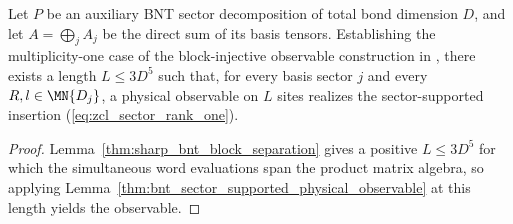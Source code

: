 \begin{lemma}%
    \label{thm:bnt_rank_one_observables_sharp_length}
    \leanok
    Let $P$ be an auxiliary BNT sector decomposition of total bond dimension
    $D$, and let $A=\bigoplus_j A_j$ be the direct sum of its basis tensors.
    Establishing the multiplicity-one case of the block-injective observable
    construction in
    \cite[proof of Theorem~3.8, lines~1252--1256]{Cirac2016MPDO_arXiv}, there
    exists a length $L\leq3D^5$ such that, for every basis sector $j$ and every
    $R,l\in\MN{D_j}$, a physical observable on $L$ sites realizes the
    sector-supported insertion (\ref{eq:zcl_sector_rank_one}).
\end{lemma}
\begin{proof}\leanok
    Lemma~\ref{thm:sharp_bnt_block_separation} gives a positive
    $L\leq3D^5$ for which the simultaneous word evaluations span the product
    matrix algebra, so applying
    Lemma~\ref{thm:bnt_sector_supported_physical_observable} at this length
    yields the observable.
\end{proof}

